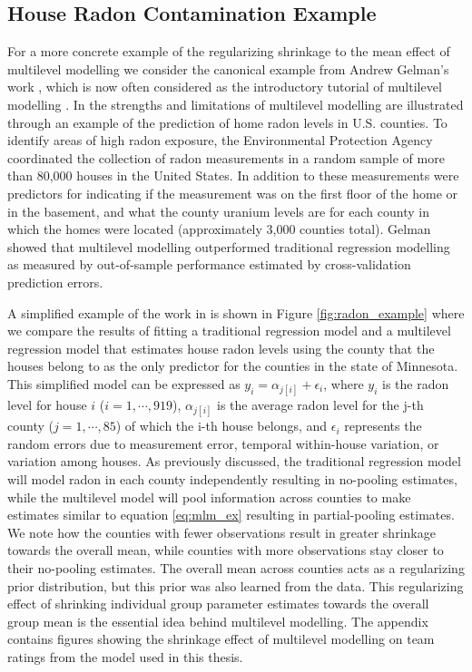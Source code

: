 \subsection*{House Radon Contamination Example}

For a more concrete example of the regularizing shrinkage to the mean effect of multilevel modelling we consider the canonical example from Andrew Gelman's work \cite{Gelman2006} \cite{Gelman2006b}, which is now often considered as the introductory tutorial of multilevel modelling \cite{pymc32018}. In \cite{Gelman2006b} the strengths and limitations of multilevel modelling are illustrated through an example of the prediction of home radon levels in U.S. counties. To identify areas of high radon exposure, the Environmental Protection Agency coordinated the collection of radon measurements in a random sample of more than 80,000 houses in the United States. In addition to these measurements were predictors for indicating if the measurement was on the first floor of the home or in the basement, and what the county uranium levels are for each county in which the homes were located (approximately 3,000 counties total). Gelman showed that multilevel modelling outperformed traditional regression modelling as measured by out-of-sample performance estimated by cross-validation prediction errors.

A simplified example of the work in \cite{Gelman2006b} is shown in Figure \ref{fig:radon_example} where we compare the results of fitting a traditional regression model and a multilevel regression model that estimates house radon levels using the county that the houses belong to as the only predictor for the counties in the state of Minnesota. This simplified model can be expressed as $y_i = \alpha_{j[i]} + \epsilon_i$, where $y_i$ is the radon level for house $i$ ($i=1, \cdots ,919$), $\alpha_{j[i]}$ is the average radon level for the j-th county ($j=1, \cdots ,85$) of which the i-th house belongs, and $\epsilon_i$ represents the random errors due to measurement error, temporal within-house variation, or variation among houses. As previously discussed, the traditional regression model will model radon in each county independently resulting in no-pooling estimates, while the multilevel model will pool information across counties to make estimates similar to equation \ref{eq:mlm_ex} resulting in partial-pooling estimates. We note how the counties with fewer observations result in greater shrinkage towards the overall mean, while counties with more observations stay closer to their no-pooling estimates. The overall mean across counties acts as a regularizing prior distribution, but this prior was also learned from the data. This regularizing effect of shrinking individual group parameter estimates towards the overall group mean is the essential idea behind multilevel modelling. The appendix contains figures showing the shrinkage effect of multilevel modelling on team ratings from the model used in this thesis.

